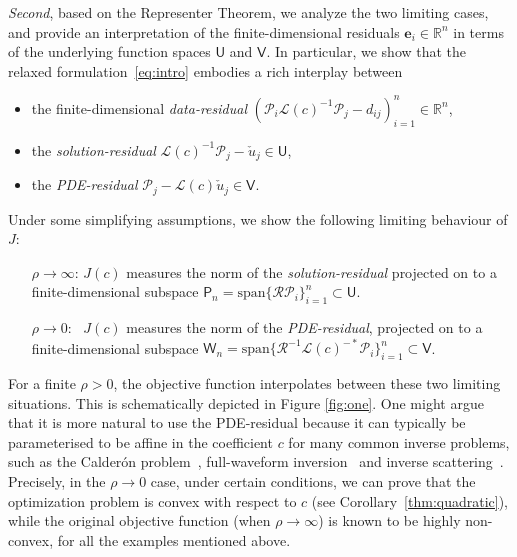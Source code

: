\documentclass[12pt]{amsart}
\begin{document}
\emph{Second}, based on the Representer Theorem, we analyze the two limiting cases, and provide an interpretation of the finite-dimensional residuals $\mathbf{e}_i\in\mathbb{R}^n$ in terms of the underlying function spaces $\mathsf{U}$ and $\mathsf{V}$. In particular, we show that the relaxed formulation~\eqref{eq:intro} embodies a rich interplay between
\begin{itemize}
    \item the finite-dimensional \emph{data-residual} $\left(\mathcal{P}_{i}\mathcal{L}(c)^{-1}\mathcal{P}_{j} - {d}_{ij} \right)^{n}_{i=1}\in \mathbb{R}^n$,
    \item the \emph{solution-residual} $\mathcal{L}(c)^{-1}\mathcal{P}_j - \check{u}_j \in \mathsf{U}$,
    \item the \emph{PDE-residual}  $\mathcal{P}_j - \mathcal{L}(c)\check{u}_j \in \mathsf{V}$.
\end{itemize}
Under some simplifying assumptions, we show the following limiting behaviour of $J$:
\begin{itemize}
\item[$\rho\rightarrow \infty$:] $J(c)$ measures the norm of the \emph{solution-residual} projected on to a finite-dimensional subspace $\mathsf{P}_n = \text{span}\{\mathcal{R}\mathcal{P}_i\}_{i=1}^n \subset \mathsf{U}$.
 
\item[$\rho\rightarrow 0$:\,\,\,] $J(c)$ measures the norm of the \emph{PDE-residual}, projected on to a finite-dimensional subspace $\mathsf{W}_n = \text{span}\{\mathcal{R}^{-1}\mathcal{L}(c)^{-*}\mathcal{P}_i\}_{i=1}^n \subset \mathsf{V}$.
\end{itemize}
For a finite $\rho > 0$, the objective function interpolates between these two limiting situations. This is schematically depicted in Figure \ref{fig:one}. One might argue that it is more natural to use the PDE-residual because it can typically be parameterised to be affine in the coefficient $c$ for many common inverse problems, such as the Calder\'on problem~\cite{uhlmann2009electrical}, full-waveform inversion~\cite{van2015penalty} and inverse scattering~\cite{cakoni2005qualitative}. Precisely, in the $\rho\rightarrow 0$ case, under certain conditions, we can prove that the optimization problem is convex with respect to $c$ (see Corollary~\ref{thm:quadratic}), while the original objective function (when $\rho \rightarrow \infty$) is known to be highly non-convex, for all the examples mentioned above. 
\end{document}
